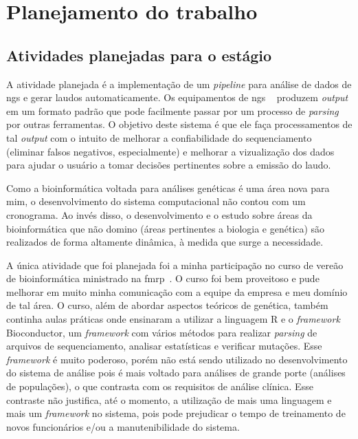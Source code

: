 \chapter{Planejamento do trabalho}
\label{chap:atividadesPlanejadas}

\section{Atividades planejadas para o estágio}

A atividade planejada é a implementação de um \textit{pipeline} para análise de dados de \gls{ngs} e gerar laudos automaticamente. Os equipamentos de \gls{ngs}
~\cite{NGEN} produzem \textit{output} em um formato padrão que pode facilmente passar por um processo de \textit{parsing} 
por outras ferramentas. O objetivo deste sistema é que ele faça processamentos de tal \textit{output} com o intuito de melhorar a 
confiabilidade do sequenciamento (eliminar falsos negativos, especialmente) 
e melhorar a vizualização dos dados para ajudar o usuário a tomar decisões pertinentes sobre a emissão do laudo.

Como a bioinformática voltada para análises genéticas é uma área nova para mim, o desenvolvimento do sistema computacional não contou com um cronograma.
Ao invés disso, o desenvolvimento e o estudo sobre áreas da bioinformática que não domino (áreas pertinentes a biologia e genética) são realizados de 
forma altamente dinâmica, à medida que surge a necessidade.

A única atividade que foi planejada foi a minha participação no curso de vereão de bioinformática ministrado na \gls{fmrp}~\cite{BIOC}. O curso foi bem proveitoso
e pude melhorar em muito minha comunicação com a equipe da empresa e meu domínio de tal área. O curso, além de abordar aspectos teóricos de genética, também
continha aulas práticas onde ensinaram a utilizar a linguagem R e o \textit{framework} Bioconductor, um \textit{framework} com vários métodos para
realizar \textit{parsing} de arquivos de sequenciamento, analisar estatísticas e verificar mutações. Esse \textit{framework} é muito poderoso, porém não
está sendo utilizado no desenvolvimento do sistema de análise pois é mais voltado para análises de grande porte (análises de populações), o que contrasta com
os requisitos de análise clínica. Esse contraste não justifica, até o momento, a utilização de mais uma linguagem e mais um \textit{framework} no sistema, pois
pode prejudicar o tempo de treinamento de novos funcionários e/ou a manutenibilidade do sistema.

